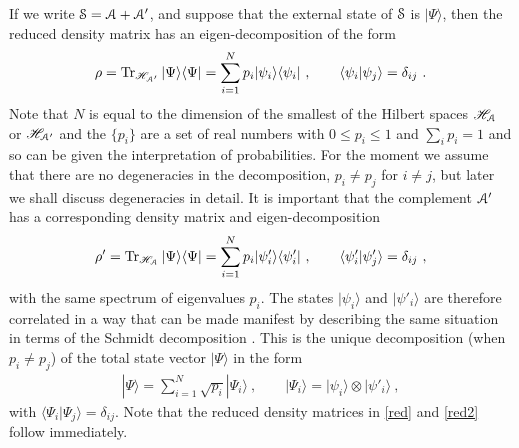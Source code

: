 \documentclass[12pt]{article}
\def\BS{{\EuScript S}}
\def\BA{{\EuScript A}}
\def\BAP{{{\EuScript A}'}}
\def\BH{{\mathscr H}}
\newcommand{\Tr}{\operatorname{Tr}}
\def\bra#1{\langle #1|}
\def\ket#1{| #1\rangle}
\def\braket#1#2{\VEV{#1 | #2}}
\def\VEV#1{\langle #1\rangle}
\newcommand{\EQ}[1]{\begin{equation}\begin{split} #1
\end{split}\end{equation}}
\begin{document}
\noindent If we write $\BS=\BA+\BA'$, and suppose that the external state of $\BS$ is $\ket{\Psi}$, then the reduced density matrix has an eigen-decomposition of the form
\EQ{
\rho=\Tr_{\BH_{\BA'}}\ket{\Psi}\bra{\Psi}=\sum_{i=1}^N p_i\ket{\psi_i}\bra{\psi_i}\ ,\qquad
\braket{\psi_i}{\psi_j}=\delta_{ij}\ .
\label{red}
}
Note that $N$ is equal to the dimension of the smallest of the Hilbert spaces $\BH_\BA$ or $\BH_\BAP$ and the $\{p_i\}$ are a set of real numbers with $0\leq p_i\leq1$ and $\sum_ip_i=1$ and so can be given the interpretation of probabilities. For the moment we assume that there are no degeneracies in the decomposition, $p_i\neq p_j$ for $i\neq j$, but later we shall discuss degeneracies in detail. It is important that the complement $\BA'$ has a corresponding density matrix and eigen-decomposition
\EQ{
\rho'=\Tr_{\BH_\BA}\ket{\Psi}\bra{\Psi}=\sum_{i=1}^N p_i\ket{\psi'_i}\bra{\psi'_i}\ ,\qquad
\braket{\psi'_i}{\psi'_j}=\delta_{ij}\ ,
\label{red2}
}
with the same spectrum of eigenvalues $p_i$. The states $\ket{\psi_i}$ and $\ket{\psi'_i}$ are therefore correlated in a way that can be made manifest by describing the same situation in terms of the Schmidt decomposition \cite{Schm,Sch}. This is the unique decomposition (when $p_i\neq p_j$) of the total state vector $\ket{\Psi}$ in the form
\EQ{
\ket{\Psi}=\sum_{i=1}^N\sqrt{p_i}\ket{\Psi_i}\ ,\qquad\ket{\Psi_i}=\ket{\psi_i}\otimes\ket{\psi'_i}\ ,\label{sch}
}
with $\braket{\Psi_i}{\Psi_j}=\delta_{ij}$. Note that the reduced density matrices in \eqref{red} and \eqref{red2} follow immediately.
\end{document}
